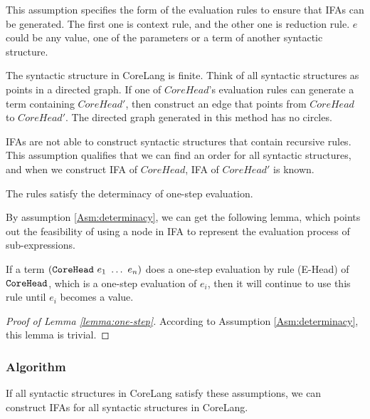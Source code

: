 This assumption specifies the form of the evaluation rules to ensure that IFAs can be generated. The first one is context rule, and the other one is reduction rule. $e$ could be any value, one of the parameters or a term of another syntactic structure.

\begin{Asm}
\label{Asm:orderliness}
The syntactic structure in CoreLang is finite. Think of all syntactic structures as points in a directed graph. If one of $CoreHead$'s evaluation rules can generate a term containing $CoreHead'$, then construct an edge that points from $CoreHead$ to $CoreHead'$. The directed graph generated in this method has no circles.
\end{Asm}

IFAs are not able to construct syntactic structures that contain recursive rules. This assumption qualifies that we can find an order for all syntactic structures, and when we construct IFA of $CoreHead$, IFA of $CoreHead'$ is known.

\begin{Asm}
\label{Asm:determinacy}
The rules satisfy the determinacy of one-step evaluation.
\end{Asm}

By assumption \ref{Asm:determinacy}, we can get the following lemma, which points out the feasibility of using a node in IFA to represent the evaluation process of sub-expressions.

\begin{lemma}
\label{lemma:one-step}
If a term $(\mbox{\tt CoreHead}~e_1~\ldots~e_n)$ does a one-step evaluation by rule (E-Head) of $\mbox{\tt CoreHead}$, which is a one-step evaluation of $e_i$, then it will continue to use this rule until $e_i$ becomes a value.
\end{lemma}

\begin{proof}[Proof of Lemma \ref{lemma:one-step}]
According to Assumption \ref{Asm:determinacy}, this lemma is trivial.
\end{proof}

\subsubsection{Algorithm}

\begin{mythm}
\label{mythm:Rule2IFA}
If all syntactic structures in CoreLang satisfy these assumptions, we can construct IFAs for all syntactic structures in CoreLang.
\end{mythm}

